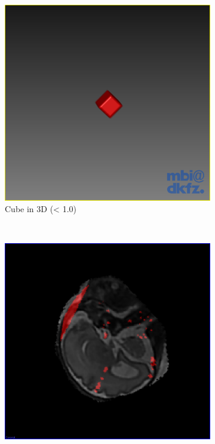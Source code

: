 \begin{figure}[H]
\begin{subfigure}[b]{0.5\textwidth}
    \includegraphics[width=\textwidth]{images/thresholding/results/cube_3d.png}
    \caption{Cube in 3D (< 1.0)}
    \label{fig:thresholdingresultscube3d}
  \end{subfigure}
  ~ %
  \begin{subfigure}[b]{0.5\textwidth}
    \includegraphics[width=\textwidth]{images/thresholding/results/scan_2d.png}

\end{subfigure}
\end{figure}
